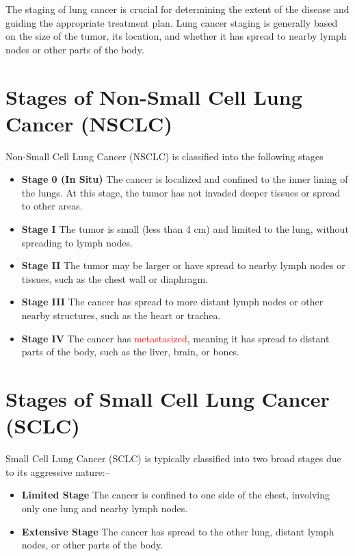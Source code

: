 The staging of lung cancer is crucial for determining the extent of the disease and guiding the appropriate treatment plan. Lung cancer staging is generally based on the size of the tumor, its location, and whether it has spread to nearby lymph nodes or other parts of the body.

\section{Stages of Non-Small Cell Lung Cancer (NSCLC)}
Non-Small Cell Lung Cancer (NSCLC) is classified into the following stages

\begin{itemize}
    \item \textbf{Stage 0 (In Situ)} The cancer is localized and confined to the inner lining of the lungs. At this stage, the tumor has not invaded deeper tissues or spread to other areas.
    \item \textbf{Stage I} The tumor is small (less than 4 cm) and limited to the lung, without spreading to lymph nodes.
    \item \textbf{Stage II} The tumor may be larger or have spread to nearby lymph nodes or tissues, such as the chest wall or diaphragm.
    \item \textbf{Stage III} The cancer has spread to more distant lymph nodes or other nearby structures, such as the heart or trachea.
    \item \textbf{Stage IV} The cancer has \textcolor{red}{metastasized}, meaning it has spread to distant parts of the body, such as the liver, brain, or bones.
\end{itemize}

\section{Stages of Small Cell Lung Cancer (SCLC)} 
Small Cell Lung Cancer (SCLC) is typically classified into two broad stages due to its aggressive nature:--

\begin{itemize}
    \item \textbf{Limited Stage} The cancer is confined to one side of the chest, involving only one lung and nearby lymph nodes.
    \item \textbf{Extensive Stage} The cancer has spread to the other lung, distant lymph nodes, or other parts of the body.
\end{itemize}

